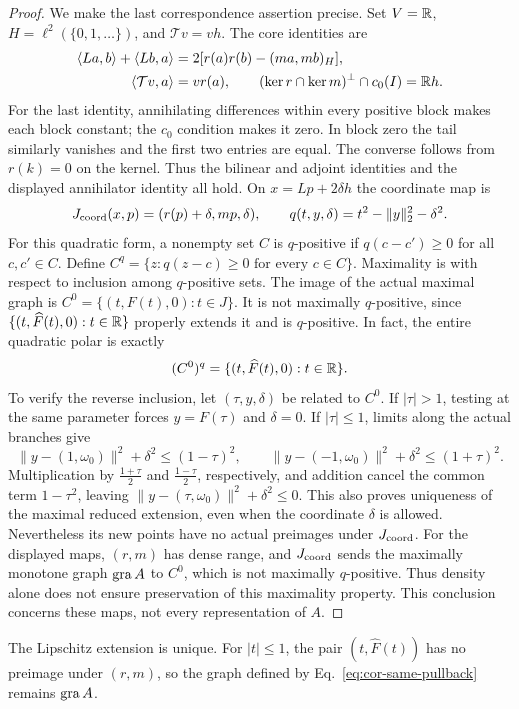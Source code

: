 \begin{proof}
We make the last correspondence assertion precise. Set $V=\mathbb R$,
$H=\ell^2(\{0,1,\ldots\})$, and $\mathcal T v=vh$. The core identities are
\begin{align*}
\langle La,b\rangle+\langle Lb,a\rangle&=2[r(a)r(b)-(ma,mb)_H],\\
\langle \mathcal T v,a\rangle&=v r(a),\qquad
(\ker r\cap\ker m)^\perp\cap c_0(I)=\mathbb R h.
\end{align*}
For the last identity, annihilating differences within every positive
block makes each block constant; the $c_0$ condition makes it zero.
In block zero the tail similarly vanishes and the first two entries
are equal. The converse follows from $r(k)=0$ on the kernel.
Thus the bilinear and adjoint identities and the displayed annihilator
identity all hold.
On $x=Lp+2\delta h$ the coordinate map is
\[
J_{\rm coord}(x,p)=(r(p)+\delta,mp,\delta),\qquad
q(t,y,\delta)=t^2-\|y\|_2^2-\delta^2.
\]
For this quadratic form, a nonempty set $C$ is $q$-positive if
$q(c-c')\ge0$ for all $c,c'\in C$. Define
$C^q=\{z:q(z-c)\ge0\text{ for every }c\in C\}$.
Maximality is with respect to inclusion among $q$-positive sets.
The image of the actual maximal graph is
$C^0=\{(t,F(t),0):t\in J\}$. It is not maximally $q$-positive,
since $\{(t,\widehat F(t),0):t\in\mathbb R\}$ properly extends it and
is $q$-positive. In fact, the entire quadratic polar is exactly
\[
(C^0)^q=\{(t,\widehat F(t),0):t\in\mathbb R\}.
\]
To verify the reverse inclusion, let $(\tau,y,\delta)$ be related
to $C^0$. If $|\tau|>1$, testing at the same parameter forces
$y=F(\tau)$ and $\delta=0$. If $|\tau|\le1$, limits along the
actual branches give
\[
\|y-(1,\omega_0)\|^2+\delta^2\le(1-\tau)^2,\qquad
\|y-(-1,\omega_0)\|^2+\delta^2\le(1+\tau)^2.
\]
Multiplication by $\frac{1+\tau}{2}$ and $\frac{1-\tau}{2}$, respectively,
and addition cancel the common term $1-\tau^2$, leaving
$\|y-(\tau,\omega_0)\|^2+\delta^2\le0$.
This also proves uniqueness of the maximal reduced extension, even
when the coordinate $\delta$ is allowed. Nevertheless its new points
have no actual preimages under $J_{\rm coord}$.
For the displayed maps, $(r,m)$ has dense range, and $J_{\rm coord}$
sends the maximally monotone graph $\operatorname{gra} A$ to $C^0$, which is not
maximally $q$-positive. Thus density alone does not ensure preservation
of this maximality property. This conclusion concerns these maps,
not every representation of $A$.
\end{proof}
The Lipschitz extension is unique. For $|t|\le1$, the pair
$(t,\widehat F(t))$ has no preimage under $(r,m)$, so the graph defined
by Eq.~\eqref{eq:cor-same-pullback} remains $\operatorname{gra} A$.

